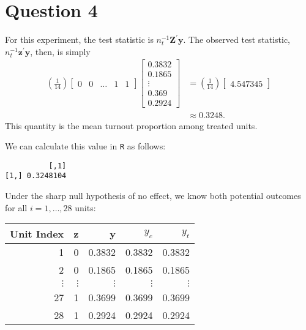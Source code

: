 \documentclass[
  12pt,
  leqno]{article}
\newenvironment{Shaded}{\begin{snugshade}}{\end{snugshade}}
\newcommand{\CommentTok}[1]{\textcolor[rgb]{0.56,0.35,0.01}{\textit{#1}}}
\newcommand{\DecValTok}[1]{\textcolor[rgb]{0.00,0.00,0.81}{#1}}
\newcommand{\KeywordTok}[1]{\textcolor[rgb]{0.13,0.29,0.53}{\textbf{#1}}}
\newcommand{\NormalTok}[1]{#1}
\newcommand{\OperatorTok}[1]{\textcolor[rgb]{0.81,0.36,0.00}{\textbf{#1}}}
\newcommand{\StringTok}[1]{\textcolor[rgb]{0.31,0.60,0.02}{#1}}
\begin{document}
\section*{Question 4}

For this experiment, the test statistic is
\(n_t^{-1}\mathbf{Z}^{\prime}\mathbf{y}\). The observed test statistic,
\(n_t^{-1}\mathbf{z}^{\prime}\mathbf{y}\), then, is simply
\begin{align*}
\left(\frac{1}{14}\right) \begin{bmatrix} 0 & 0 & \dots & 1 & 1 \end{bmatrix} \begin{bmatrix}  0.3832 \\ 0.1865 \\ \vdots \\ 0.369 \\ 0.2924 \end{bmatrix} & = \left(\frac{1}{14}\right)\begin{bmatrix} 4.547345 \end{bmatrix} \\
& \approx 0.3248.
\end{align*} This quantity is the mean turnout proportion among treated
units.

We can calculate this value in \texttt{R} as follows:

\begin{Shaded}
\end{Shaded}

\begin{verbatim}
          [,1]
[1,] 0.3248104
\end{verbatim}

Under the sharp null hypothesis of no effect, we know both potential
outcomes for all \(i = 1 , \dots , 28\) units:

\begin{table}[ht]
\centering
\begin{tabular}{rrrrr}
\hline
Unit Index & z & y & $y_c$ & $y_t$ \\ 
\hline
1  & 0  & 0.3832 & 0.3832 & 0.3832 \\ 
2  & 0  & 0.1865 & 0.1865 & 0.1865 \\ 
$\vdots$ & $\vdots$  & $\vdots$ & $\vdots$ & $\vdots$ \\ 
27 & 1  & 0.3699 & 0.3699 & 0.3699 \\ 
28 & 1  & 0.2924 & 0.2924 & 0.2924 \\ 
\hline
\end{tabular}
\end{table}
\end{document}
